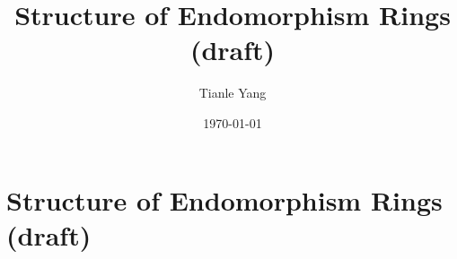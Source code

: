 \documentclass{noteformyself}
\title{Structure of Endomorphism Rings (draft)}
\author{Tianle Yang}
\date{\today}
\begin{document}
    \maketitle

    \section{Structure of Endomorphism Rings (draft)}


\end{document}
